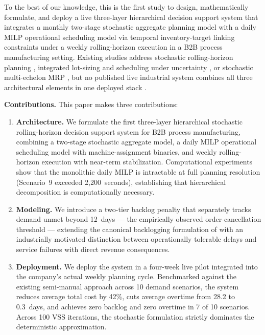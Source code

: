 \documentclass[11pt]{article}
\begin{document}
\indent To the best of our knowledge, this is the first study to design, mathematically formulate, and deploy a live three-layer hierarchical decision support system that integrates a monthly two-stage stochastic aggregate planning model with a daily MILP operational scheduling model via temporal inventory-target linking constraints under a weekly rolling-horizon execution in a B2B process manufacturing setting. Existing studies address stochastic rolling-horizon planning \citep{forel2023stochastic}, integrated lot-sizing and scheduling under uncertainty \citep{drexl1997lss, ferreira2009softdrink, toledo2009sitlsp}, or stochastic multi-echelon MRP \citep{thevenin2021mrp}, but no published live industrial system combines all three architectural elements in one deployed stack \citep{englberger2016stochastic}.

\medskip
\noindent\textbf{Contributions.} This paper makes three contributions:
\begin{enumerate}
  \item \textbf{Architecture.} We formulate the first three-layer hierarchical stochastic rolling-horizon decision support system for B2B process manufacturing, combining a two-stage stochastic aggregate model, a daily MILP operational scheduling model with machine-assignment binaries, and weekly rolling-horizon execution with near-term stabilization. Computational experiments show that the monolithic daily MILP is intractable at full planning resolution (Scenario~9 exceeded 2,200~seconds), establishing that hierarchical decomposition is computationally necessary.
  \item \textbf{Modeling.} We introduce a two-tier backlog penalty that separately tracks demand unmet beyond 12~days --- the empirically observed order-cancellation threshold --- extending the canonical backlogging formulation of \citet{PochetWolsey1988} with an industrially motivated distinction between operationally tolerable delays and service failures with direct revenue consequences.
  \item \textbf{Deployment.} We deploy the system in a four-week live pilot integrated into the company's actual weekly planning cycle. Benchmarked against the existing semi-manual approach across 10 demand scenarios, the system reduces average total cost by 42\%, cuts average overtime from 28.2 to 0.3~days, and achieves zero backlog and zero overtime in 7 of 10 scenarios. Across 100 VSS iterations, the stochastic formulation strictly dominates the deterministic approximation.
\end{enumerate}
\end{document}
